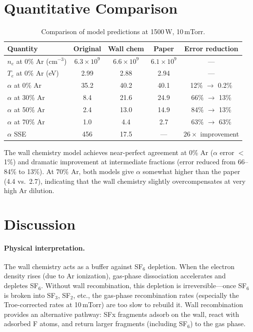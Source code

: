 \documentclass[11pt,a4paper]{article}
\newcommand{\Te}{T_e}
\newcommand{\nelec}{n_e}
\begin{document}
\section{Quantitative Comparison}

\begin{table}[H]
\centering
\caption{Comparison of model predictions at 1500\,W, 10\,mTorr.}
\label{tab:comparison}
\small
\begin{tabular}{lcccc}
\toprule
Quantity & Original & Wall chem & Paper & Error reduction \\
\midrule
$\nelec$ at 0\% Ar (cm$^{-3}$) & $6.3 \times 10^9$ & $6.6 \times 10^9$ & $6.1 \times 10^9$ & --- \\
$\Te$ at 0\% Ar (eV) & 2.99 & 2.88 & 2.94 & --- \\
$\alpha$ at 0\% Ar & 35.2 & 40.2 & 40.1 & 12\% $\to$ 0.2\% \\
$\alpha$ at 30\% Ar & 8.4 & 21.6 & 24.9 & 66\% $\to$ 13\% \\
$\alpha$ at 50\% Ar & 2.4 & 13.0 & 14.9 & 84\% $\to$ 13\% \\
$\alpha$ at 70\% Ar & 1.0 & 4.4 & 2.7 & 63\% $\to$ 63\% \\
\midrule
$\alpha$ SSE & 456 & 17.5 & --- & $26\times$ improvement \\
\bottomrule
\end{tabular}
\end{table}

The wall chemistry model achieves near-perfect agreement at 0\% Ar ($\alpha$ error $<$1\%) and dramatic improvement at intermediate fractions (error reduced from 66--84\% to 13\%).  At 70\% Ar, both models give $\alpha$ somewhat higher than the paper (4.4 vs.\ 2.7), indicating that the wall chemistry slightly overcompensates at very high Ar dilution.

\section{Discussion}

\paragraph{Physical interpretation.}  The wall chemistry acts as a buffer against SF$_6$ depletion.  When the electron density rises (due to Ar ionization), gas-phase dissociation accelerates and depletes SF$_6$.  Without wall recombination, this depletion is irreversible---once SF$_6$ is broken into SF$_3$, SF$_2$, etc., the gas-phase recombination rates (especially the Troe-corrected rates at 10\,mTorr) are too slow to rebuild it.  Wall recombination provides an alternative pathway: SFx fragments adsorb on the wall, react with adsorbed F atoms, and return larger fragments (including SF$_6$) to the gas phase.
\end{document}
